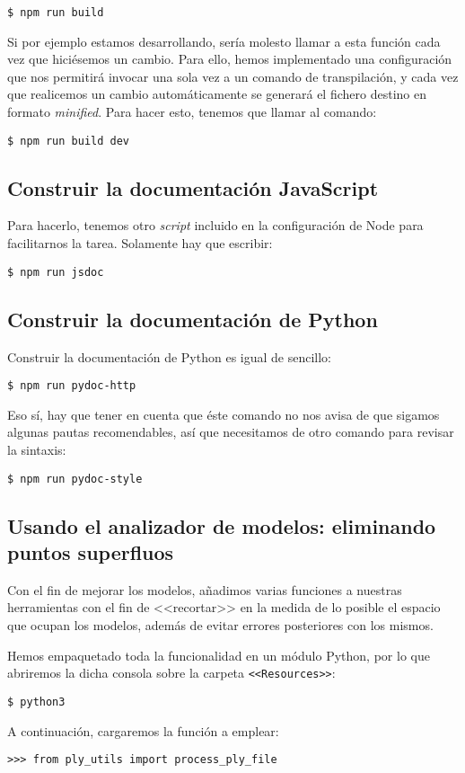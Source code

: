 \noindent\verb|$ npm run build|

Si por ejemplo estamos desarrollando, sería molesto llamar a esta función cada vez que hiciésemos un cambio. Para ello, hemos implementado una configuración que nos permitirá invocar una sola vez a un comando de transpilación, y cada vez que realicemos un cambio automáticamente se generará el fichero destino en formato \textit{minified}. Para hacer esto, tenemos que llamar al comando:

\noindent\verb|$ npm run build dev|

\subsection{Construir la documentación JavaScript}
Para hacerlo, tenemos otro \textit{script} incluido en la configuración de Node para facilitarnos la tarea. Solamente hay que escribir:

\noindent\verb|$ npm run jsdoc|

\subsection{Construir la documentación de Python}
Construir la documentación de Python es igual de sencillo:

\noindent\verb|$ npm run pydoc-http|

Eso sí, hay que tener en cuenta que éste comando no nos avisa de que sigamos algunas pautas recomendables, así que necesitamos de otro comando para revisar la sintaxis:

\noindent\verb|$ npm run pydoc-style|

\subsection{Usando el analizador de modelos: eliminando puntos superfluos}
Con el fin de mejorar los modelos, añadimos varias funciones a nuestras herramientas con el fin de <<recortar>> en la medida de lo posible el espacio que ocupan los modelos, además de evitar errores posteriores con los mismos.

Hemos empaquetado toda la funcionalidad en un módulo Python, por lo que abriremos la dicha consola sobre la carpeta \texttt{<<Resources>>}:

\noindent\verb|$ python3|

A continuación, cargaremos la función a emplear:

\noindent\verb|>>> from ply_utils import process_ply_file|

